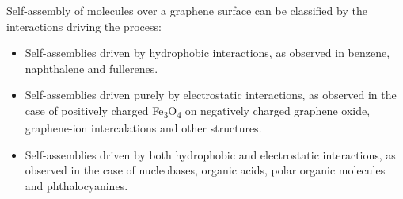 Self-assembly of molecules over a graphene surface can be classified by the interactions driving the process:
\begin{itemize}
    \item Self-assemblies driven by hydrophobic interactions, as observed in benzene\supercite{alzahrani_first-principles_2010,shen_adsorption_2021,hassan_interactions_2014,wang_substituent_2014}, naphthalene and fullerenes\supercite{lu_using_2012}.
    \item Self-assemblies driven purely by electrostatic interactions, as observed in the case of positively charged Fe\textsubscript{3}O\textsubscript{4} on negatively charged graphene oxide\supercite{yang_electrostatic_2020}, graphene-ion intercalations\supercite{lee_li_2012,yoon_chloroaluminate_2022,yu_reversible_2023,ji_lithium_2019} and other structures\supercite{groger_step-wise_2009}. 
    \item Self-assemblies driven by both hydrophobic and electrostatic interactions, as observed in the case of nucleobases\supercite{heckl_two-dimensional_1991,freund_structure_1997,mu_temperature-dependent_2013,gottarelli_self-assembly_2000,ciesielski_nanopatterning_2010}, organic acids\supercite{rochefort_interaction_2009,griessl_self-assembled_2002}, polar organic molecules\supercite{song_noncovalent_2016,su_composites_2009} and phthalocyanines\supercite{jarvinen_self-assembly_2014,hamalainen_self-assembly_2012}.
\end{itemize}

